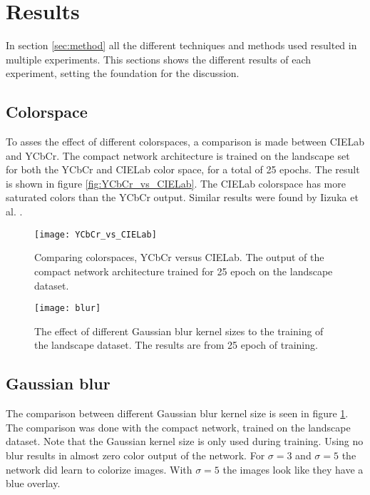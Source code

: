 \section{Results}\label{sec:results}
	
In section \ref{sec:method} all the different techniques and methods used resulted in multiple experiments. This sections shows the different results of each experiment, setting the foundation for the discussion.

\subsection{Colorspace}
To asses the effect of different colorspaces, a comparison is made between CIELab and YCbCr. The compact network architecture is trained on the landscape set for both the YCbCr and CIELab color space, for a total of 25 epochs. The result is shown in figure \ref{fig:YCbCr_vs_CIELab}. The CIELab colorspace has more saturated colors than the YCbCr output. Similar results were found by Iizuka et al. \cite{IizukaSIGGRAPH2016}.

\begin{figure}
	\begin{minipage}{.48\textwidth}
		
		\centering
		\texttt{[image: YCbCr\_vs\_CIELab]}
		\caption{Comparing colorspaces, YCbCr versus CIELab. The output of the compact network architecture trained for 25 epoch on the landscape dataset.}
		\label{fig:YCbCr_vs_CIELab}
		
	\end{minipage}
	\begin{minipage}{0.48\textwidth}
			\centering
			\texttt{[image: blur]}
			\caption{The effect of different Gaussian blur kernel sizes to the training of the landscape dataset. The results are from 25 epoch of training.}
			\label{fig:blur}
	\end{minipage}
\end{figure}

\subsection{Gaussian blur}
The comparison between different Gaussian blur kernel size is seen in figure \ref{fig:blur}. The comparison was done with the compact network, trained on the landscape dataset. Note that the Gaussian kernel size is only used during training. Using no blur results in almost zero color output of the network. For $\sigma = 3$ and $\sigma = 5$ the network did learn to colorize images. With $\sigma = 5$ the images look like they have a blue overlay.

